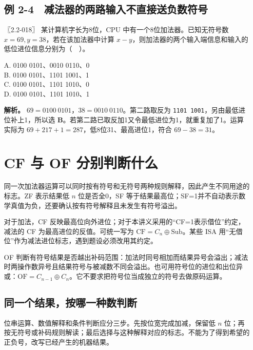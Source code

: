 \subsection{例 2-4　减法器的两路输入不直接送负数符号}\label{co-ex2-4}

\noindent{}〖2.2-018〗 某计算机字长为8位，CPU 中有一个8位加法器。已知无符号数 \(x=69,y=38\)，若在该加法器中计算 \(x-y\)，则加法器的两个输入端信息和输入的低位进位信息分别为（　）。

A. 0100 0101、0010 0110、0\\
B. 0100 0101、1101 1001、1\\
C. 0100 0101、1101 1010、0\\
D. 0100 0101、1101 1010、1


\textbf{解析。} \(69=0100\ 0101\)，\(38=0010\ 0110\)。第二路取反为 \texttt{1101\ 1001}，另由最低进位补上1，所以选 \textbf{B}。若第二路已取反加1又令最低进位为1，就重复加了1。运算实际为 \(69+217+1=287\)，低8位31、最高进位1，符合 \(69-38=31\)。

\section{CF 与 OF 分别判断什么}\label{co-02-05}

同一次加法器运算可以同时按有符号和无符号两种规则解释，因此产生不同用途的标志。ZF 表示结果低 \(n\) 位是否全0，SF 等于结果最高位；SF=1并不自动表示数学真值为负，还要确认按有符号解释且未发生有符号溢出。

对于加法，CF 反映最高位向外进位；对于本讲义采用的``CF=1表示借位''约定，减法的 CF 为最高进位的反值。可统一写为 \(\mathrm{CF}=C_n\oplus\mathrm{Sub}\)。某些 ISA 用``无借位''作为减法进位标志，遇到题设必须改用其约定。

OF 判断有符号结果是否越出补码范围：加法时同号相加而结果异号会溢出；减法时两操作数异号且结果符号与被减数不同会溢出。也可用符号位的进位和出位异或：\(\mathrm{OF}=C_{n-1}\oplus C_n\)。它不要求把符号位当成独立的符号去做原码运算。

\subsection{同一个结果，按哪一种数判断}\label{co-c02-h114}

位串运算、数值解释和条件判断应分三步。先按位宽完成加减，保留低 \(n\) 位；再按无符号或补码规则解读；最后选择与这种解释对应的标志。不能为了得到希望的正负号，改写已经产生的机器结果。

